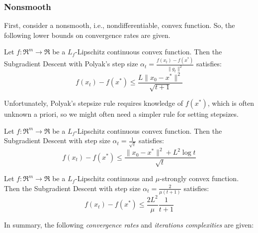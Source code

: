 
\subsubsection{Nonsmooth}

First, consider a nonsmooth, i.e., nondifferentiable, convex function. So, the following lower bounds on convergence rates are given.

\begin{theorem}[\href{http://www.princeton.edu/~yc5/ele522_optimization/lectures/subgradient_methods.pdf\#page=34}{Subgradient Descent convergence for convex functions with Polyak's stepsize}] \label{thm:cvx_polyak_subgd_convergence}
Let $f: \Re^m \rightarrow \Re$ be a $L_f$-Lipschitz continuous convex function. Then the Subgradient Descent with Polyak's step size $\displaystyle \alpha_t = \frac{f(x_t) - f(x^*)}{\| g_t \|^2}$ satisfies:
$$
f(x_t) - f(x^*) \leq \frac{L \| x_0 - x^* \|^2}{\sqrt{t+1}}
$$
\end{theorem}

Unfortunately, Polyak’s stepsize rule requires knowledge of $f(x^*)$, which is often unknown a priori, so we might often need a simpler rule for setting stepsizes.

\begin{theorem}[\href{http://www.princeton.edu/~yc5/ele522_optimization/lectures/subgradient_methods.pdf\#page=39}{Subgradient Descent convergence for convex functions}] \label{thm:cvx_subgd_convergence}
Let $f: \Re^m \rightarrow \Re$ be a $L_f$-Lipschitz continuous convex function. Then the Subgradient Descent with step size $\displaystyle \alpha_t = \frac{1}{\sqrt{t}}$ satisfies:
$$
f(x_t) - f(x^*) \leq \frac{\| x_0 - x^* \|^2 + L^2 \log t}{\sqrt{t}}
$$
\end{theorem}

\begin{theorem}[\href{http://www.princeton.edu/~yc5/ele522_optimization/lectures/subgradient_methods.pdf\#page=41}{Subgradient Descent convergence for strongly convex functions}] \label{thm:str_cvx_subgd_convergence}
Let $f: \Re^m \rightarrow \Re$ be a $L_f$-Lipschitz continuous and $\mu$-strongly convex function. Then the Subgradient Descent with step size $\displaystyle \alpha_t = \frac{2}{\mu(t+1)}$ satisfies:
$$
f(x_t) - f(x^*) \leq \frac{2L^2}{\mu} \frac{1}{t+1}
$$
\end{theorem}

In summary, the following \emph{convergence rates} and \emph{iterations complexities} are given:

